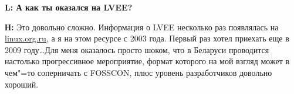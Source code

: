 \documentclass[10pt, a5paper]{article}
\begin{document}
{\noindent \bf L: А как ты оказался на LVEE?}

{\noindent \bf Н:} Это довольно сложно. Информация о LVEE несколько раз появлялась на \url{linux.org.ru}, а я на этом ресурсе с 2003 года. 
Первый раз хотел приехать еще в 2009 году\ldots Для меня оказалось просто шоком, что в Беларуси проводится настолько прогрессивное мероприятие, формат которого на мой взгляд может в чем"=то соперничать с FOSSCON, плюс уровень разработчиков довольно хороший. 








\end{document}
